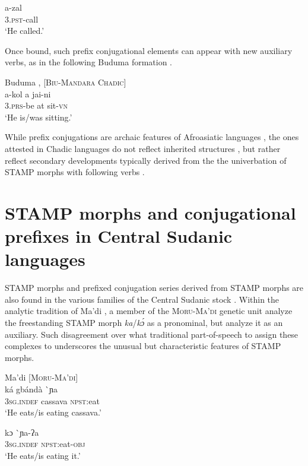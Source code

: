 \documentclass[output=paper]{langsci/langscibook}
\begin{document}
\ex \label{ex:anderson:45b}
\gll a-zal\\
  3\textsc{.pst}-call\\
\glt `He called.'
\z
\z

Once bound, such prefix conjugational elements can appear with new auxiliary verbs, as in the following Buduma formation .

\ea\label{ex:anderson:46}
Buduma \citep[376]{Pawlak2001}, \citep[55]{Lukas1939}    [\textsc{Biu-Mandara Chadic}]\\
\gll a-kol  a  jai-ni\\
\textsc{3.prs}-be  at  sit\textsc{-vn}\\
\glt `He is/was sitting.' 
\z

While prefix conjugations are archaic features of Afroasiatic languages \citep{Hodge1971, Schuh1976, Mukarovsky1983, Voigt1987}, the ones attested in Chadic languages do not reflect inherited structures \citep{Schuh1976, Voigt1989, Jungraithmayr2005, Jungraithmayr2006}, but rather reflect secondary developments typically derived from the the univerbation of STAMP morphs with following verbs \citep{Caron2006, Shay2008, Anderson2011, Anderson2012}.

\section{STAMP morphs and conjugational prefixes in Central Sudanic languages}\label{sec:Anderson:8}

STAMP morphs and prefixed conjugation series derived from STAMP morphs are also found in the various families of the Central Sudanic stock \citep{Anderson2015}. Within the analytic tradition of Ma'di , a member of the \textsc{Moru-Ma'di} genetic unit \citet{BlackingsFabb2003} analyze the freestanding STAMP morph \textit{ka}/\textit{k\'ɔ} as a pronominal, but \citet{TuckerBryan1966} analyze it as an auxiliary. Such disagreement over what traditional part-of-speech to assign these complexes to underscores the unusual but characteristic features of STAMP morphs. 

\ea\label{ex:anderson:47}
Ma'di \citep[13]{BlackingsFabb2003}      [\textsc{Moru-Ma'di}]\\
\ea\label{ex:anderson:47a}
\gll ká    gbándà  \`{}ɲa  \\
  \textsc{3sg.indef}  cassava  \textsc{npst}:eat\\
\glt `He eats/is eating cassava.'      

\ex\label{ex:anderson:47b}
\gll kɔ    \`{}ɲa-ʔa\\
  3\textsc{sg.indef}  \textsc{npst}:eat-\textsc{obj}\\
\glt `He eats/is eating it.'
\z
\z
\end{document}
